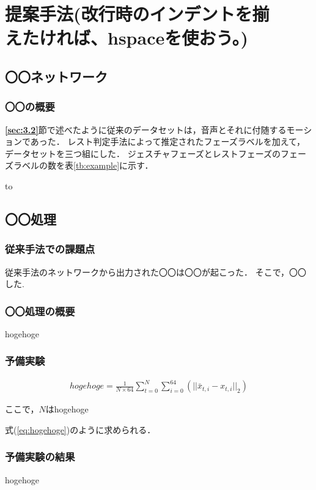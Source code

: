 \chapter[提案手法]{提案手法(改行時のインデントを揃\\\hspace*{2.48cm}えたければ、hspaceを使おう。)}
\section{〇〇ネットワーク}
\label{sec:4.2}
\subsection{〇〇の概要}
\label{sub:4.2.1}
\textbf{\ref{sec:3.2}}節で述べたように従来のデータセットは，音声とそれに付随するモーションであった．
レスト判定手法によって推定されたフェーズラベルを加えて，データセットを三つ組にした．
ジェスチャフェーズとレストフェーズのフェーズラベルの数を表\ref{tb:example}に示す．

\begin{table}[ht] 
\caption{表を作る} 
\label{tb:example}
\hbox to
\end{table}

\section{〇〇処理}
\label{sec:4.3}
\subsection{従来手法での課題点}
\label{sub:4.3.1}
従来手法のネットワークから出力された〇〇は〇〇が起こった．
そこで，〇〇した.

\subsection{〇〇処理の概要}
\label{sub:4.3.2}
hogehoge

\subsection{予備実験}
\label{sub:4.3.3}

\begin{align}
hogehoge = \frac{1}{N\times64} \sum_{t=0}^N\sum_{i=0}^{64} (||\bar{x}_{t,i} -x_{t,i}||_2)
\label{eq:hogehoge}
\end{align}

ここで，$N$はhogehoge

式(\ref{eq:hogehoge})のように求められる．

\subsection{予備実験の結果}
\label{sub:4.3.4}
hogehoge
